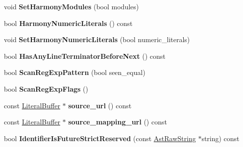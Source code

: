 \begin{DoxyCompactItemize}
\item 
\hypertarget{classv8_1_1internal_1_1_scanner_a2fc693592be0fef82f2b46b7b4307a05}{}void {\bfseries Set\+Harmony\+Modules} (bool modules)\label{classv8_1_1internal_1_1_scanner_a2fc693592be0fef82f2b46b7b4307a05}

\item 
\hypertarget{classv8_1_1internal_1_1_scanner_a340282a0c27d573b012241ceb51cb2f2}{}bool {\bfseries Harmony\+Numeric\+Literals} () const \label{classv8_1_1internal_1_1_scanner_a340282a0c27d573b012241ceb51cb2f2}

\item 
\hypertarget{classv8_1_1internal_1_1_scanner_a3d7e637cee2900cd7d31aef38562f5b2}{}void {\bfseries Set\+Harmony\+Numeric\+Literals} (bool numeric\+\_\+literals)\label{classv8_1_1internal_1_1_scanner_a3d7e637cee2900cd7d31aef38562f5b2}

\item 
\hypertarget{classv8_1_1internal_1_1_scanner_ad259592e177f3cc880571680ac568e07}{}bool {\bfseries Has\+Any\+Line\+Terminator\+Before\+Next} () const \label{classv8_1_1internal_1_1_scanner_ad259592e177f3cc880571680ac568e07}

\item 
\hypertarget{classv8_1_1internal_1_1_scanner_a7f3e6dbf7a430800ad808fa457660af5}{}bool {\bfseries Scan\+Reg\+Exp\+Pattern} (bool seen\+\_\+equal)\label{classv8_1_1internal_1_1_scanner_a7f3e6dbf7a430800ad808fa457660af5}

\item 
\hypertarget{classv8_1_1internal_1_1_scanner_a60300a8582fe8901734159199e8d9789}{}bool {\bfseries Scan\+Reg\+Exp\+Flags} ()\label{classv8_1_1internal_1_1_scanner_a60300a8582fe8901734159199e8d9789}

\item 
\hypertarget{classv8_1_1internal_1_1_scanner_a1f31d1068b5fa28a82d2a91e76ac1617}{}const \hyperlink{classv8_1_1internal_1_1_literal_buffer}{Literal\+Buffer} $\ast$ {\bfseries source\+\_\+url} () const \label{classv8_1_1internal_1_1_scanner_a1f31d1068b5fa28a82d2a91e76ac1617}

\item 
\hypertarget{classv8_1_1internal_1_1_scanner_a9df4bed4be1a8cfe7bac47d3a1059925}{}const \hyperlink{classv8_1_1internal_1_1_literal_buffer}{Literal\+Buffer} $\ast$ {\bfseries source\+\_\+mapping\+\_\+url} () const \label{classv8_1_1internal_1_1_scanner_a9df4bed4be1a8cfe7bac47d3a1059925}

\item 
\hypertarget{classv8_1_1internal_1_1_scanner_a48a4737599b149a311ac343391271cd4}{}bool {\bfseries Identifier\+Is\+Future\+Strict\+Reserved} (const \hyperlink{classv8_1_1internal_1_1_ast_raw_string}{Ast\+Raw\+String} $\ast$string) const \label{classv8_1_1internal_1_1_scanner_a48a4737599b149a311ac343391271cd4}

\end{DoxyCompactItemize}
